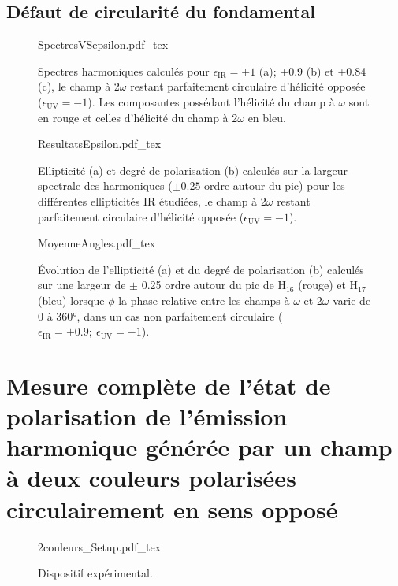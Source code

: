 \section{Défaut de circularité du fondamental}
\begin{figure}
\centering
\def\svgwidth{0.75\textwidth}
{SpectresVSepsilon.pdf_tex}
\caption{Spectres harmoniques calculés pour $\epsilon_{\text{IR}} = +1$ (a); +0.9 (b) et +0.84 (c), le champ à 2$\omega$ restant parfaitement circulaire d'hélicité opposée ($\epsilon_{\text{UV}} = -1$). Les composantes possédant l'hélicité du champ à $\omega$ sont en rouge et celles d'hélicité du champ à 2$\omega$ en bleu.}
\label{fig:SpectresVSepsilon}
\end{figure}

\begin{figure}
\centering
\def\svgwidth{\textwidth}
{ResultatsEpsilon.pdf_tex}
\caption{Ellipticité (a) et degré de polarisation (b) calculés sur la largeur spectrale des harmoniques ($\pm 0.25$ ordre autour du pic) pour les différentes ellipticités IR étudiées, le champ à 2$\omega$ restant parfaitement circulaire d'hélicité opposée ($\epsilon_{\text{UV}} = -1$).}
\label{fig:ResultatsEpsilon}
\end{figure}

\begin{figure}
\centering
\def\svgwidth{\textwidth}
{MoyenneAngles.pdf_tex}
\caption{\'{E}volution de l'ellipticité (a) et du degré de polarisation (b) calculés sur une largeur de $\pm$ 0.25 ordre autour du pic de H$_{16}$ (rouge) et H$_{17}$ (bleu) lorsque $\phi$ la phase relative entre les champs à $\omega$ et 2$\omega$ varie de 0 à 360°, dans un cas non parfaitement circulaire ($\epsilon_{\text{IR}} = +0.9 ; \: \epsilon_{\text{UV}} = -1$).}
\label{fig:MoyenneAngles}
\end{figure}









\chapter{Mesure complète de l'état de polarisation de l'émission harmonique générée par un champ à deux couleurs polarisées circulairement en sens opposé} 
\label{chap:MesurePolar}

\begin{figure}
\centering
\def\svgwidth{\textwidth}
{2couleurs_Setup.pdf_tex}
\caption{Dispositif expérimental.}
\label{fig:2couleurs_Setup}
\end{figure}


